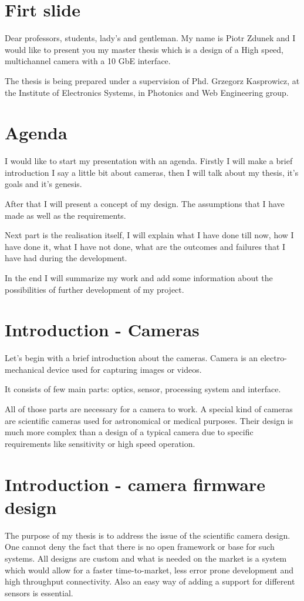 \documentclass[10pt,a4paper]{article}
\author{Piotr Zdunek}
\begin{document}
\section{Firt slide}
Dear professors, students, lady’s and gentleman. My name is Piotr Zdunek and I would like to present you my master thesis which is a design of a High speed, multichannel camera with a 10 GbE interface. 

The thesis is being prepared under a supervision of Phd. Grzegorz Kasprowicz, at the Institute of Electronics Systems, in Photonics and Web Engineering group. 

\section{Agenda}

I would like to start my presentation with an agenda. Firstly I will make a brief introduction I  say a little bit about cameras, then I will talk about my thesis, it's goals and it's genesis. 

After that I will present a concept of my design. 
The assumptions that I have made as well as the requirements. 

Next part is the realisation itself, I will explain what I have done till now, how I have done it, what I have not done, what are the outcomes and failures that I have had during the development.

In the end I will summarize my work and add some information about the possibilities of further development of my project. 

\section{Introduction - Cameras}
Let's begin with a brief introduction about the cameras. Camera is an electro-mechanical device used for capturing images or videos.

It consists of few main parts: optics, sensor, processing system and interface. 

All of those parts are necessary for a camera to work. A special kind of cameras are scientific cameras used for astronomical or medical purposes. Their design is much more complex than a design of a typical camera due to specific requirements like sensitivity or high speed operation. 


\section{Introduction -  camera firmware design}
The purpose of my thesis is to address the issue of the scientific camera design. One cannot deny the fact that there is no open framework or base for such systems. All designs are custom and what is needed on the market is a system which would allow for a faster time-to-market, less error prone development and high throughput connectivity. Also an easy way of adding a support for different sensors is essential. 
\end{document}
